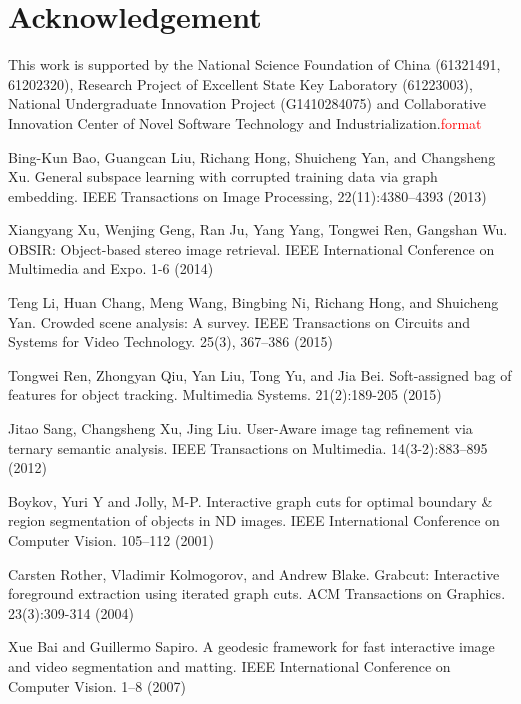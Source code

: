 \documentclass[runningheads,a4paper]{llncs}
\begin{document}
\section{Acknowledgement}This work is supported by the National Science Foundation of China (61321491, 61202320), Research Project of Excellent State Key Laboratory (61223003), National Undergraduate Innovation Project (G1410284075) and Collaborative Innovation Center of Novel Software Technology and Industrialization.\textcolor{red}{format}

%
%
\begin{thebibliography}{4}

Bing-Kun Bao, Guangcan Liu, Richang Hong, Shuicheng Yan, and Changsheng Xu. General subspace learning with corrupted training data via graph embedding. IEEE Transactions on Image Processing, 22(11):4380--4393 (2013)

 	Xiangyang Xu, Wenjing Geng, Ran Ju, Yang Yang, Tongwei Ren, Gangshan Wu. OBSIR: Object-based stereo image retrieval. IEEE International Conference on Multimedia and Expo. 1-6 (2014)

 Teng Li, Huan Chang, Meng Wang, Bingbing Ni, Richang Hong, and Shuicheng Yan. Crowded scene analysis: A survey. IEEE Transactions on Circuits and Systems for Video Technology. 25(3), 367--386 (2015)

Tongwei Ren, Zhongyan Qiu, Yan Liu, Tong Yu, and Jia Bei. Soft-assigned bag of features for object tracking. Multimedia Systems. 21(2):189-205 (2015)

Jitao Sang, Changsheng Xu, Jing Liu. User-Aware image tag refinement via ternary semantic analysis. IEEE Transactions on Multimedia. 14(3-2):883--895 (2012)


 Boykov, Yuri Y and Jolly, M-P. Interactive graph cuts for optimal boundary \& region segmentation of objects in ND images. IEEE International Conference on Computer Vision. 105--112 (2001)

 Carsten Rother, Vladimir Kolmogorov, and Andrew Blake. Grabcut: Interactive foreground extraction using iterated graph cuts. ACM Transactions on Graphics. 23(3):309-314 (2004)
    
 Xue Bai and Guillermo Sapiro. A geodesic framework for fast interactive image and video segmentation and matting. IEEE International Conference on Computer Vision. 1--8 (2007)


\end{thebibliography}
\end{document}
